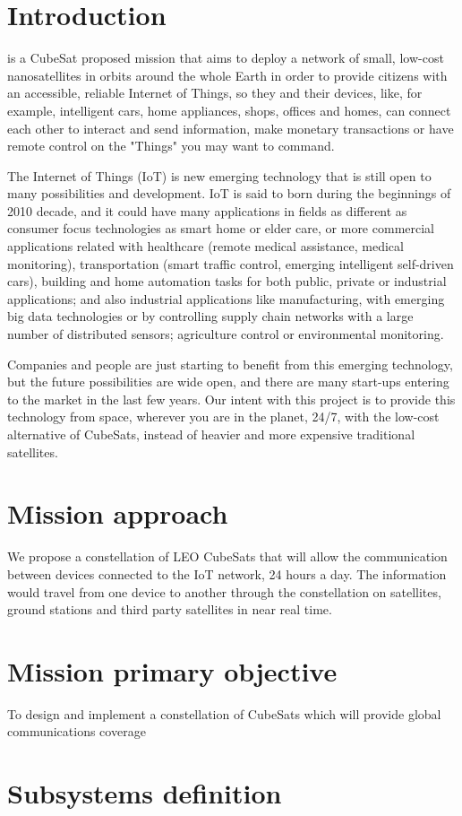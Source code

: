 \newpage
\section{Introduction}

\MissionName is a CubeSat proposed mission that aims to deploy a network of small,
low-cost nanosatellites in orbits around the whole Earth in order to provide
citizens with an accessible, reliable Internet of Things, so they and their devices,
like, for example, intelligent cars, home appliances, shops, offices and homes, can
connect each other to interact and send information, make monetary transactions or
have remote control on the "Things" you may want to command.

The Internet of Things (IoT) is new emerging technology that is still open to many
possibilities and development. IoT is said to born during the beginnings of 2010 decade,
and it could have many applications in fields as different as consumer focus technologies
as smart home or elder care, or more commercial applications related with healthcare
(remote medical assistance, medical monitoring), transportation (smart traffic control,
emerging intelligent self-driven cars), building and home automation tasks for both
public, private or industrial applications; and also industrial applications like
manufacturing, with emerging big data technologies or by controlling supply chain
networks with a large number of distributed sensors; agriculture control or environmental
monitoring.

Companies and people are just starting to benefit from this emerging technology,
but the future possibilities are wide open, and there are many start-ups
entering to the market in the last few years. Our intent with this project is
to provide this technology from space, wherever you are in the planet, 24/7, with
the low-cost alternative of CubeSats, instead of heavier and more expensive
traditional satellites.

\section{Mission approach}
We propose a constellation of LEO CubeSats that will allow the communication between devices
connected to the IoT network, 24 hours a day. The information would travel from one
device to another through the constellation on satellites, ground stations and third party
satellites in near real time.

\section{Mission primary objective}

To design and implement a constellation of CubeSats which will provide global communications coverage

\section{Subsystems definition}

